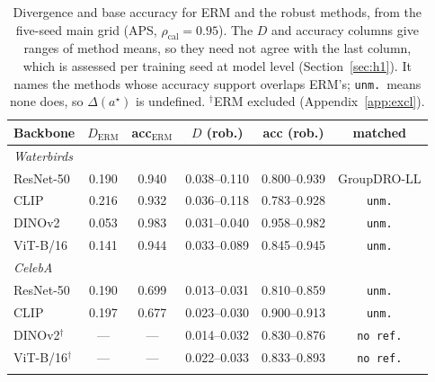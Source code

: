 \documentclass[pdflatex,sn-basic]{sn-jnl}%
\theoremstyle{thmstyleone}%
\newcommand{\rhocal}{\rho_{\mathrm{cal}}}
\begin{document}
\begin{table}[t]
\centering
\caption{Divergence and base accuracy for ERM and the robust methods, from the five-seed main grid (APS, $\rhocal=0.95$). The $D$ and accuracy columns give ranges of method means, so they need not agree with the last column, which is assessed per training seed at model level (Section~\ref{sec:h1}). It names the methods whose accuracy support overlaps ERM's; \texttt{unm.}\ means none does, so $\Delta(a^\star)$ is undefined. $^{\dagger}$ERM excluded (Appendix~\ref{app:excl}).}
\label{tab:h1}
\footnotesize
\setlength{\tabcolsep}{4pt}
\begin{tabular}{lccccc}
\toprule
Backbone & $D_{\mathrm{ERM}}$ & acc$_{\mathrm{ERM}}$ & $D$ (rob.) & acc (rob.) & matched \\
\midrule
\multicolumn{6}{l}{\emph{Waterbirds}} \\
ResNet-50 & 0.190 & 0.940 & 0.038--0.110 & 0.800--0.939 & GroupDRO-LL \\
CLIP & 0.216 & 0.932 & 0.036--0.118 & 0.783--0.928 & \texttt{unm.} \\
DINOv2 & 0.053 & 0.983 & 0.031--0.040 & 0.958--0.982 & \texttt{unm.} \\
ViT-B/16 & 0.141 & 0.944 & 0.033--0.089 & 0.845--0.945 & \texttt{unm.} \\
\midrule
\multicolumn{6}{l}{\emph{CelebA}} \\
ResNet-50 & 0.190 & 0.699 & 0.013--0.031 & 0.810--0.859 & \texttt{unm.} \\
CLIP & 0.197 & 0.677 & 0.023--0.030 & 0.900--0.913 & \texttt{unm.} \\
DINOv2$^{\dagger}$ & --- & --- & 0.014--0.032 & 0.830--0.876 & \texttt{no ref.} \\
ViT-B/16$^{\dagger}$ & --- & --- & 0.022--0.033 & 0.833--0.893 & \texttt{no ref.} \\
\botrule
\end{tabular}
\end{table}
\end{document}
